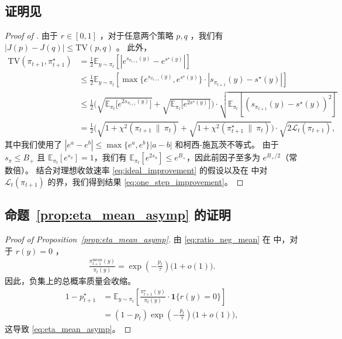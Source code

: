 \documentclass{article}
\theoremstyle{plain}
\theoremstyle{definition}
\theoremstyle{remark}
\newcommand{\TV}{\mathrm{TV}}
\newcommand{\E}{\mathbb{E}}
\newcommand{\abs}[1]{\left|#1\right|}
\begin{document}
\subsection{证明见 }
\label{sec:proof_cor_one_step}
\begin{proof}[Proof of ]
    由于 $r\in[0,1]$ ，对于任意两个策略 $p,q$ ，我们有 $\abs{J(p)-J(q)}\leq \TV(p,q)$ 。  
此外，
    \begin{align*}
        \TV(\pi_{t+1},\pi^\star_{t+1})
        &=\frac{1}{2}\E_{y\sim\pi_t}\left[\abs{e^{s_{\pi_{t+1}}(y)}-e^{s^\star(y)}}\right]\\
        &\leq \frac{1}{2}\E_{y\sim\pi_t}\left[\max\bigl\{e^{s_{\pi_{t+1}}(y)},e^{s^\star(y)}\bigr\}\cdot\abs{s_{\pi_{t+1}}(y)-s^\star(y)}\right]\\
        &\leq \frac{1}{2}\Big(\sqrt{\E_{\pi_t}\big[e^{2s_{\pi_{t+1}}(y)}\big]}+\sqrt{\E_{\pi_t}\big[e^{2s^\star(y)}\big]}\Big)\cdot
        \sqrt{\E_{\pi_t}\left[(s_{\pi_{t+1}}(y)-s^\star(y))^2\right]}\\
        &= \frac{1}{2}\Big(\sqrt{1+\chi^2(\pi_{t+1}~\|~\pi_t)}+\sqrt{1+\chi^2(\pi^\star_{t+1}~\|~\pi_t)}\Big)\cdot \sqrt{2\mathcal{L}_t(\pi_{t+1})},
    \end{align*}
    其中我们使用了 $\abs{e^a-e^b}\leq \max\{e^a,e^b\}\abs{a-b}$ 和柯西-施瓦茨不等式。  
由于 $s_\pi\leq B_+$ 且 $\E_{\pi_t}[e^{s_\pi}]=1$，我们有 $\E_{\pi_t}[e^{2s_\pi}]\leq e^{B_+}$，因此前因子至多为 $e^{B_+/2}$（常数倍）。  
结合对理想收敛速率 \eqref{eq:ideal_improvement} 的假设以及在  中对 $\mathcal{L}_t(\pi_{t+1})$ 的界，我们得到结果 \eqref{eq:one_step_improvement}。
\end{proof}

\subsection{命题~\ref{prop:eta_mean_asymp} 的证明}\label{sec:proof_eta_mean}
\begin{proof}[Proof of Proposition~\ref{prop:eta_mean_asymp}]
    由 \eqref{eq:ratio_neg_mean} 在  中，对于 $r(y)=0$ ，
    \begin{align*}
        \frac{\pi^\mathrm{mean}_{t+1}(y)}{\pi_t(y)}=\exp\left(-\frac{p_t}{\tau}\right)\big(1+o(1)\big).
    \end{align*}
    因此，负集上的总概率质量会收缩。
    \begin{align*} 
        1-p_{t+1}^\star
        &=\E_{y\sim\pi_t}\left[\frac{\pi_{t+1}^\star(y)}{\pi_t(y)}\cdot \mathbf{1}\{r(y)=0\}\right]\\
        &=(1-p_t)\exp\left(-\frac{p_t}{\tau}\right)\big(1+o(1)\big),
    \end{align*}
    这导致 \eqref{eq:eta_mean_asymp}。
\end{proof}
\end{document}
